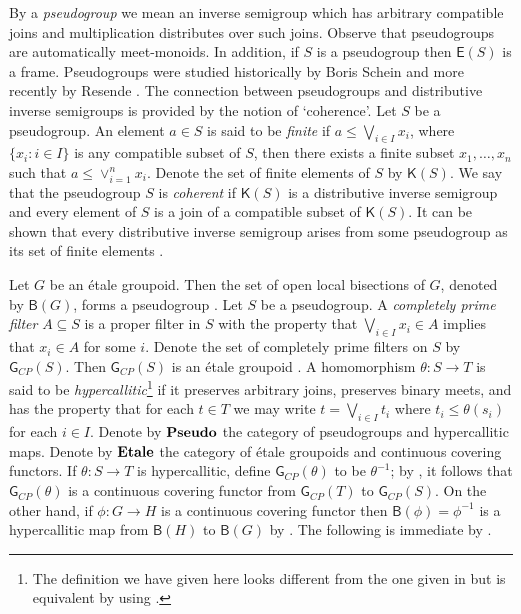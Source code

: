 \documentclass[a4paper]{amsart}
\begin{document}
By a {\em pseudogroup} we mean an inverse semigroup which has arbitrary compatible joins
and multiplication distributes over such joins.
Observe that pseudogroups are automatically meet-monoids.
In addition, if $S$ is a pseudogroup then $\mathsf{E}(S)$ is a frame.
Pseudogroups were studied historically by Boris Schein \cite{Schein} and more recently by Resende \cite{Resende2}.
The connection between pseudogroups and distributive inverse semigroups is provided by the notion of `coherence'.
Let $S$ be a pseudogroup.
An element $a \in S$ is said to be {\em finite} if $a \leq \bigvee_{i \in I} x_{i}$, 
where $\{x_{i} \colon i \in I\}$ is any compatible subset of $S$, 
then there exists a finite subset $x_{1},\ldots, x_{n}$ such that $a \leq \vee_{i=1}^{n} x_{i}$.
Denote the set of finite elements of $S$ by $\mathsf{K}(S)$.
We say that the pseudogroup $S$ is {\em coherent} if $\mathsf{K}(S)$ is a distributive
inverse semigroup and every element of $S$ is a join of a compatible subset of $\mathsf{K}(S)$.
It can be shown that every distributive inverse semigroup arises from
some pseudogroup as its set of finite elements \cite[Proposition 3.5]{LL}.

Let $G$ be an \'etale groupoid.
Then the set of open local bisections of $G$, denoted by $\mathsf{B}(G)$,
forms a pseudogroup \cite[Proposition 2.1]{LL}.
Let $S$ be a pseudogroup.
A {\em completely prime filter} $A \subseteq S$ is a proper filter in $S$ 
with the property that $\bigvee_{i \in I} x_{i} \in A$ implies that $x_{i} \in A$ for some $i$.
Denote the set of completely prime filters on $S$ by $\mathsf{G}_{CP}(S)$.
Then $\mathsf{G}_{CP}(S)$ is an \'etale groupoid \cite[Proposition 2.8]{LL}.
A homomorphism $\theta \colon S \rightarrow T$ is said to be {\em hypercallitic}\footnote{The definition we have given here looks different from the one given in \cite{LL}
but is equivalent by using \cite{Resende3}.}
if it preserves arbitrary joins, preserves binary meets, and has the
property that for each $t \in T$ we may write $t = \bigvee_{i \in I} t_{i}$
where $t_{i} \leq \theta (s_{i})$ for each $i \in I$.
Denote by $\mbox{\bf Pseudo}$ the category of pseudogroups and hypercallitic maps.
Denote by $\mbox{\bf Etale}$ the category of \'etale groupoids and continuous covering functors.
If $\theta \colon S \rightarrow T$ is hypercallitic,
define $\mathsf{G}_{CP}(\theta)$ to be $\theta^{-1}$;
by \cite[Lemma 2.14 and Lemma 2.16]{LL}, it follows that $\mathsf{G}_{CP}(\theta)$ is a continuous covering functor
from $\mathsf{G}_{CP}(T)$ to $\mathsf{G}_{CP}(S)$.
On the other hand, if $\phi \colon G \rightarrow H$ is a continuous covering functor
then $\mathsf{B}(\phi) = \phi^{-1}$ is a hypercallitic map from $\mathsf{B}(H)$ to $\mathsf{B}(G)$ by
\cite[Lemma 2.19]{LL}.
The following is immediate by \cite[Corollary 2.18, Theorem 2.22]{LL}.
\end{document}

